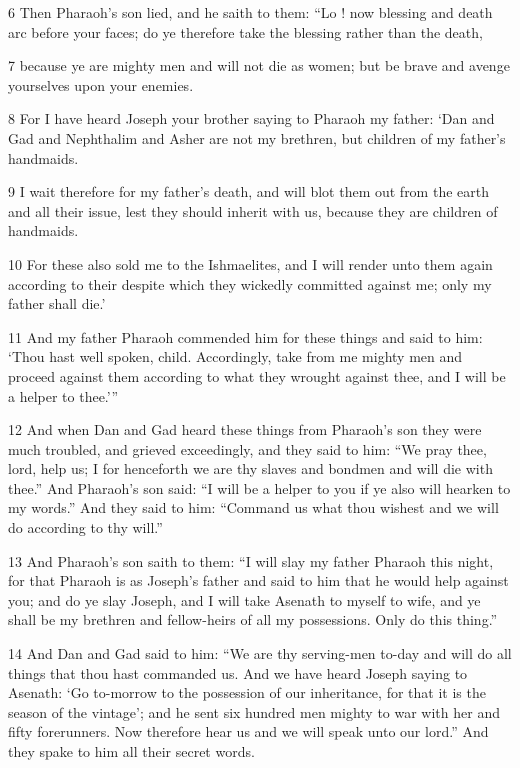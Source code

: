 \par 6 Then Pharaoh's son lied, and he saith to them: “Lo ! now blessing and death arc before your faces; do ye therefore take the blessing rather than the death, 

\par 7 because ye are mighty men and will not die as women; but be brave and avenge yourselves upon your enemies. 

\par 8 For I have heard Joseph your brother saying to Pharaoh my father: ‘Dan and Gad and Nephthalim and Asher are not my brethren, but children of my father's handmaids.

\par 9 I wait therefore for my father's death, and will blot them out from the earth and all their issue, lest they should inherit with us, because they are children of handmaids. 

\par 10 For these also sold me to the Ishmaelites, and I will render unto them again according to their despite which they wickedly committed against me; only my father shall die.’ 

\par 11 And my father Pharaoh commended him for these things and said to him: ‘Thou hast well spoken, child. Accordingly, take from me mighty men and proceed against them according to what they wrought against thee, and I will be a helper to thee.’” 

\par 12 And when Dan and Gad heard these things from Pharaoh's son they were much troubled, and grieved exceedingly, and they said to him: “We pray thee, lord, help us; I for henceforth we are thy slaves and bondmen and will die with thee.” And Pharaoh's son said: “I will be a helper to you if ye also will hearken to my words.” And they said to him: “Command us what thou wishest and we will do according to thy will.” 

\par 13 And Pharaoh's son saith to them: “I will slay my father Pharaoh this night, for that Pharaoh is as Joseph's father and said to him that he would help against you; and do ye slay Joseph, and I will take Asenath to myself to wife, and ye shall be my brethren and fellow-heirs of all my possessions. Only do this thing.” 

\par 14 And Dan and Gad said to him: “We are thy serving-men to-day and will do all things that thou hast commanded us. And we have heard Joseph saying to Asenath: ‘Go to-morrow to the possession of our inheritance, for that it is the season of the vintage’; and he sent six hundred men mighty to war with her and fifty forerunners. Now therefore hear us and we will speak unto our lord.” And they spake to him all their secret words. 

